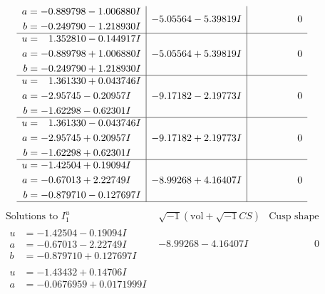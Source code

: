 \documentclass[1p]{elsarticle_modified}
\theoremstyle{definition}
\newcommand{\I}{\sqrt{-1}}
\begin{document}
$$\begin{array}{c|c|c}
\begin{aligned}
a &= -0.889798 - 1.006880 I \\
b &= -0.249790 - 1.218930 I\end{aligned}
 & -5.05564 - 5.39819 I & \phantom{-0.000000 } 0 \\ \hline\begin{aligned}
u &= \phantom{-}1.352810 - 0.144917 I \\
a &= -0.889798 + 1.006880 I \\
b &= -0.249790 + 1.218930 I\end{aligned}
 & -5.05564 + 5.39819 I & \phantom{-0.000000 } 0 \\ \hline\begin{aligned}
u &= \phantom{-}1.361330 + 0.043746 I \\
a &= -2.95745 - 0.20957 I \\
b &= -1.62298 - 0.62301 I\end{aligned}
 & -9.17182 - 2.19773 I & \phantom{-0.000000 } 0 \\ \hline\begin{aligned}
u &= \phantom{-}1.361330 - 0.043746 I \\
a &= -2.95745 + 0.20957 I \\
b &= -1.62298 + 0.62301 I\end{aligned}
 & -9.17182 + 2.19773 I & \phantom{-0.000000 } 0 \\ \hline\begin{aligned}
u &= -1.42504 + 0.19094 I \\
a &= -0.67013 + 2.22749 I \\
b &= -0.879710 - 0.127697 I\end{aligned}
 & -8.99268 + 4.16407 I & \phantom{-0.000000 } 0\\
 \hline 
 \end{array}$$\newpage$$\begin{array}{c|c|c}  
\text{Solutions to }I^u_{1}& \I (\text{vol} + \sqrt{-1}CS) & \text{Cusp shape}\\
 \hline 
\begin{aligned}
u &= -1.42504 - 0.19094 I \\
a &= -0.67013 - 2.22749 I \\
b &= -0.879710 + 0.127697 I\end{aligned}
 & -8.99268 - 4.16407 I & \phantom{-0.000000 } 0 \\ \hline\begin{aligned}
u &= -1.43432 + 0.14706 I \\
a &= -0.0676959 + 0.0171999 I \\

\end{aligned}
\end{array}$$
\end{document}
